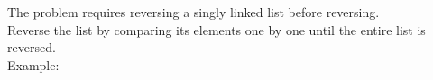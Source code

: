 \documentclass[preview]{standalone}
\begin{document}
The problem requires reversing a singly linked list before reversing.\\Reverse the list by comparing its elements one by one until the entire list is reversed.\\Example:\\
\end{document}
